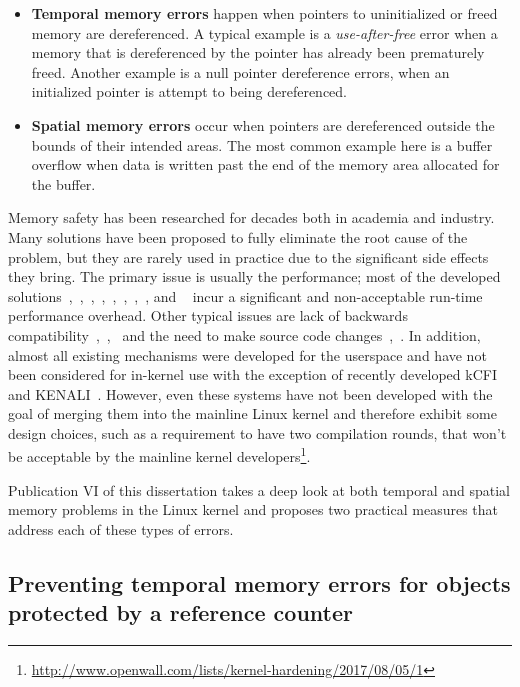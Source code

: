 \begin{itemize}
	\item \textbf{Temporal memory errors} happen when pointers to uninitialized or freed memory are dereferenced. A typical example is a \emph{use-after-free} error when a memory that is dereferenced by the pointer has already been prematurely freed. Another example is a null pointer dereference errors, when an initialized pointer is attempt to being dereferenced. 
	\item \textbf{Spatial memory errors} occur when pointers are dereferenced outside the bounds of their intended areas. The most common example here is a buffer overflow when data is written past the end of the memory area allocated for the buffer. 
\end{itemize}

Memory safety has been researched for decades both in academia and industry.
Many solutions have been proposed to fully eliminate the root cause of the problem, but they are rarely used in practice due to the significant side effects they bring. 
The primary issue is usually the performance; most of the developed solutions~\cite{hastings1991purify},~\cite{patil1995efficient},~\cite{patil1997low},~\cite{nagarakatte2009softbound},~\cite{jones1997backwards},~\cite{yong2003protecting},~\cite{xu2004efficient},~\cite{nethercote2004bounds}, and ~\cite{dhurjati2006backwards} incur a significant and non-acceptable run-time performance overhead.
Other typical issues are lack of backwards compatibility~\cite{necula2002ccured},~\cite{grossman2005cyclone},~\cite{austin1994efficient} and the need to make source code changes~\cite{necula2002ccured},~\cite{grossman2005cyclone}. 
In addition, almost all existing mechanisms were developed for the userspace and have not been considered for in-kernel use with the exception of recently developed kCFI~\cite{Rigo} and KENALI~\cite{kenali}. However, even these systems have not been developed with the goal of merging them into the mainline Linux kernel and therefore exhibit some design choices, such as a requirement to have two compilation rounds, that won't be acceptable by the mainline kernel developers\footnote{\url{http://www.openwall.com/lists/kernel-hardening/2017/08/05/1}}. 

Publication VI of this dissertation takes a deep look at both temporal and spatial memory problems in the Linux kernel and proposes two practical measures that address each of these types of errors. 

\subsection{Preventing temporal memory errors for objects protected by a reference counter}
\label{sec:kern-mem-ref-count}

